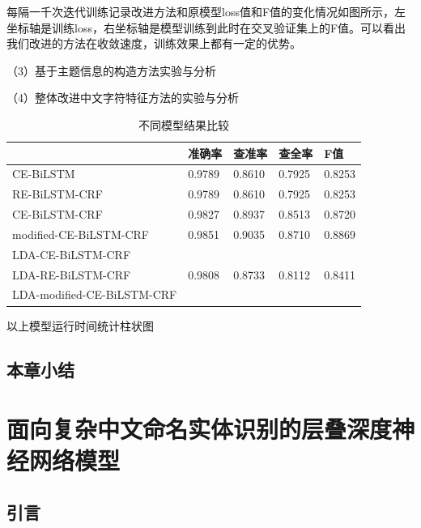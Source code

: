 \documentclass[winfonts,master,oneside,nobackinfo]{njuthesis}
\begin{document}
每隔一千次迭代训练记录改进方法和原模型loss值和F值的变化情况如图所示，左坐标轴是训练loss，右坐标轴是模型训练到此时在交叉验证集上的F值。可以看出我们改进的方法在收敛速度，训练效果上都有一定的优势。

（3）基于主题信息的构造方法实验与分析




（4）整体改进中文字符特征方法的实验与分析

\begin{table}[H]
\centering
\begin{tabular}{|l|l|l|l|l|}
\hline
\hline
                           & 准确率 & 查准率 & 查全率& F值 \\ \hline
CE-BiLSTM             &     0.9789          &   0.8610             &  0.7925      &   0.8253    \\ \hline
RE-BiLSTM-CRF              &     0.9789          &   0.8610             &  0.7925      &   0.8253    \\ \hline
CE-BiLSTM-CRF              &     0.9827          &   0.8937           &    0.8513         & 0.8720   \\ \hline
modified-CE-BiLSTM-CRF     &     0.9851         &    0.9035            &   0.8710         & 0.8869  \\ \hline
LDA-CE-BiLSTM-CRF          &               &                &             &    \\ \hline
LDA-RE-BiLSTM-CRF          &     0.9808         &   0.8733             &  0.8112           & 0.8411   \\ \hline
LDA-modified-CE-BiLSTM-CRF &               &                &             &    \\ \hline
\hline
\end{tabular}
\caption{不同模型结果比较}
\end{table}

以上模型运行时间统计柱状图


\section{本章小结}





\chapter{面向复杂中文命名实体识别的层叠深度神经网络模型}

\section{引言}
\end{document}
